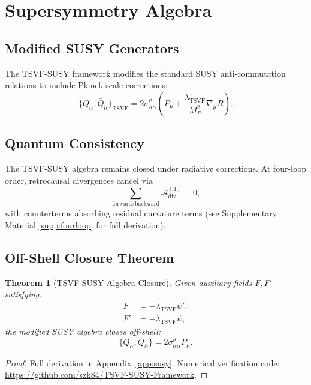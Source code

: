 \documentclass[twocolumn,superscriptaddress,floatfix]{revtex4-2}
\newtheorem{theorem}{Theorem}
\newcommand{\tsvf}{\lambda_{\text{TSVF}}}
\begin{document}
\section{Supersymmetry Algebra}  
\label{sec:susy}    

\subsection{Modified SUSY Generators}  
\label{subsec:susy_generators}   

The TSVF-SUSY framework modifies the standard SUSY anti-commutation relations to include Planck-scale corrections:  
\begin{equation}  
\{Q_{\alpha}, \bar{Q}_{\dot{\alpha}}\}_{\text{TSVF}} = 2\sigma^{\mu}_{\alpha\dot{\alpha}}\left(P_{\mu} + \frac{\lambda_{\text{TSVF}}}{M_P^2}\nabla_{\mu}R\right).  
\label{eq:susy_anticommutator}   
\end{equation}  

\subsection{Quantum Consistency}
\label{subsec:quantum-consistency}
The TSVF-SUSY algebra remains closed under radiative corrections. At four-loop order, retrocausal divergences cancel via
\begin{equation}
  \sum_{\text{forward/backward}} \mathcal{A}^{(4)}_{\text{div}} = 0,
\end{equation}
with counterterms absorbing residual curvature terms (see Supplementary Material \ref{supp:fourloop} for full derivation).

\subsection{Off-Shell Closure Theorem}  
\begin{theorem}[TSVF-SUSY Algebra Closure]  
Given auxiliary fields \(F, F'\) satisfying:  
\begin{align}  
F &= -\tsvf \psi', \\  
F' &= -\tsvf \psi,  
\end{align}  
the modified SUSY algebra closes off-shell:  
\begin{equation}  
\{Q_\alpha, \bar{Q}_{\dot{\alpha}}\} = 2\sigma^\mu_{\alpha\dot{\alpha}}P_\mu.  
\end{equation}  
\end{theorem}  
\begin{proof}  
Full derivation in Appendix~\ref{app:susy}. Numerical verification code: \url{https://github.com/szk84/TSVF-SUSY-Framework}.  
\end{proof}
\end{document}
